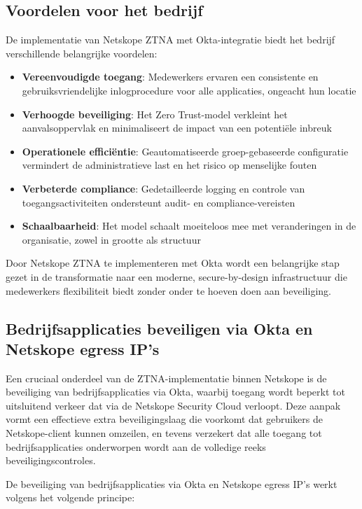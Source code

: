 \subsection{Voordelen voor het bedrijf}
De implementatie van Netskope ZTNA met Okta-integratie biedt het bedrijf verschillende belangrijke voordelen:

\begin{itemize}
    \item \textbf{Vereenvoudigde toegang}: Medewerkers ervaren een consistente en gebruiksvriendelijke inlogprocedure voor alle applicaties, ongeacht hun locatie
    \item \textbf{Verhoogde beveiliging}: Het Zero Trust-model verkleint het aanvalsoppervlak en minimaliseert de impact van een potentiële inbreuk
    \item \textbf{Operationele efficiëntie}: Geautomatiseerde groep-gebaseerde configuratie vermindert de administratieve last en het risico op menselijke fouten
    \item \textbf{Verbeterde compliance}: Gedetailleerde logging en controle van toegangsactiviteiten ondersteunt audit- en compliance-vereisten
    \item \textbf{Schaalbaarheid}: Het model schaalt moeiteloos mee met veranderingen in de organisatie, zowel in grootte als structuur
\end{itemize}

Door Netskope ZTNA te implementeren met Okta wordt een belangrijke stap gezet in de transformatie naar een moderne, secure-by-design infrastructuur die medewerkers flexibiliteit biedt zonder onder te hoeven doen aan beveiliging.

\subsection{Bedrijfsapplicaties beveiligen via Okta en Netskope egress IP's}

Een cruciaal onderdeel van de ZTNA-implementatie binnen Netskope is de beveiliging van bedrijfsapplicaties via Okta, waarbij toegang wordt beperkt tot uitsluitend verkeer dat via de Netskope Security Cloud verloopt. Deze aanpak vormt een effectieve extra beveiligingslaag die voorkomt dat gebruikers de Netskope-client kunnen omzeilen, en tevens verzekert dat alle toegang tot bedrijfsapplicaties onderworpen wordt aan de volledige reeks beveiligingscontroles.

\vspace{2ex}

De beveiliging van bedrijfsapplicaties via Okta en Netskope egress IP's werkt volgens het volgende principe:

